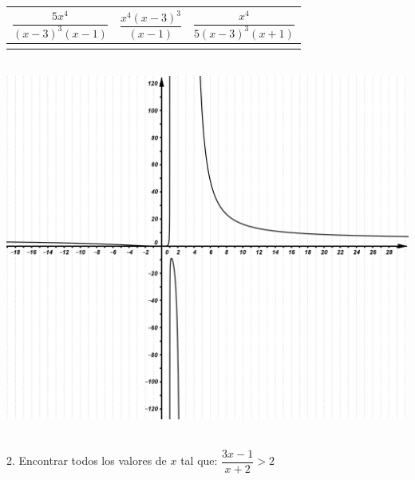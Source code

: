 \documentclass[a4paper,11pt,spanish,sans]{exam}
\newcommand{\Ts}{\rule{0pt}{2.8ex}}       %
\newcommand{\Bs}{\rule[-1.5ex]{0pt}{0pt}} %
\begin{document}
	\begin{minipage}{.5\textwidth}
		\centering
		\begin{tabular}{|c|c|c|}
			\hline
			$\dfrac{5x^4}{(x-3)^3(x-1)}$  & $\dfrac{x^4(x-3)^3}{(x-1)}$ & $\dfrac{x^4}{5(x-3)^3(x+1)}$ \Ts \Bs   \\ \hline
			&   &      \\ \hline
		\end{tabular}\\
		\centering
		\includegraphics[width= 0.95\linewidth]{2dadic3.png}
	\end{minipage}\\
	2. Encontrar todos los valores de $x$ tal que: $\dfrac{3x-1}{x+2}>2$

\setcounter{section}{0}

\newpage
\end{document}
